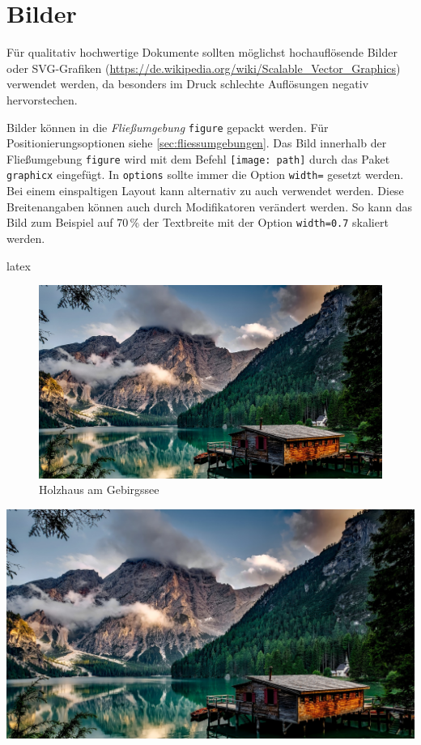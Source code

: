 \chapter{Bilder}
\label{chap:bilder}
Für qualitativ hochwertige Dokumente sollten möglichst hochauflösende Bilder oder SVG-Grafiken (\url{https://de.wikipedia.org/wiki/Scalable_Vector_Graphics}) verwendet werden, da besonders im Druck schlechte Auflösungen negativ hervorstechen.

Bilder können in die \textit{Fließumgebung} \texttt{figure} gepackt werden. Für Positionierungsoptionen siehe \autoref{sec:fliessumgebungen}. Das Bild innerhalb der Fließumgebung \texttt{figure} wird mit dem Befehl \texttt{\texttt{[image: path]}} durch das Paket \texttt{graphicx} eingefügt. In \texttt{options} sollte immer die Option \texttt{width=\columnwidth} gesetzt werden. Bei einem einspaltigen Layout kann alternativ zu \texttt{\columnwidth} auch \texttt{\textwidth} verwendet werden. Diese Breitenangaben können auch durch Modifikatoren verändert werden. So kann das Bild zum Beispiel auf 70\,\% der Textbreite mit der Option \texttt{width=0.7\textwidth} skaliert werden.

\begin{showcase}
    \begin{code}{latex}
        \begin{figure}[Hhtbp] %
            \centering %
            \includegraphics[width=0.7\columnwidth]{assets/images/bilder/pexels-pixabay-147411.jpg}
            \caption{Holzhaus am Gebirgssee}
            \label{fig:holzhaus-am-gebirgssee}
        \end{figure}
    \end{code}
    \tcblower
    \begin{center}
        \includegraphics[width=0.7\columnwidth]{assets/images/bilder/pexels-pixabay-147411.jpg}
    \end{center}
\end{showcase}

